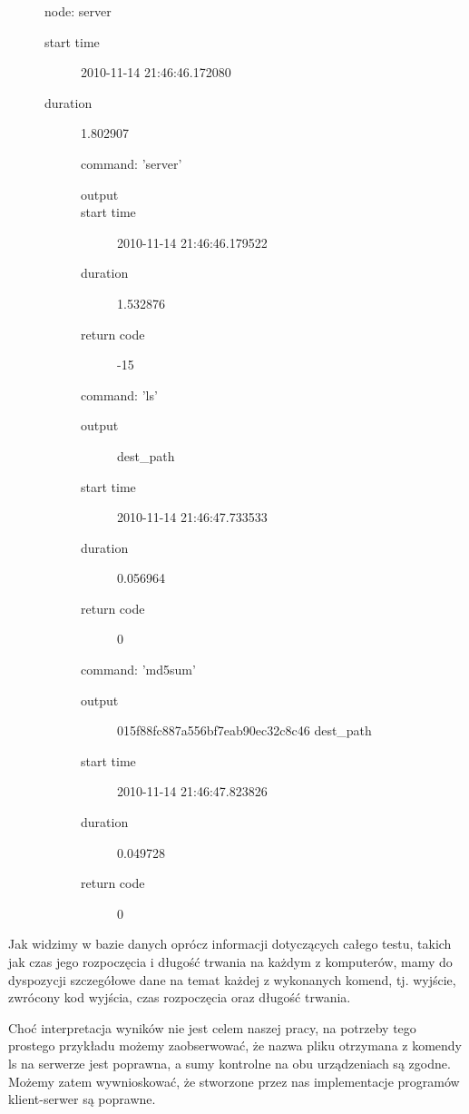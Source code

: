 \documentclass[00-praca-magisterska.tex]{subfiles}
\begin{document}
\begin{description}
\item[]
  node: server
  \begin{description}
  \item[start time] 2010-11-14 21:46:46.172080
  \item[duration] 1.802907
  \item[]
    command: 'server'
    \begin{description}
      \item[output] 
      \item[start time] 2010-11-14 21:46:46.179522
      \item[duration] 1.532876
      \item[return code] -15
    \end{description}
  \item[]
    command: 'ls'
    \begin{description}
      \item[output] dest\_path
      \item[start time] 2010-11-14 21:46:47.733533
      \item[duration] 0.056964
      \item[return code] 0
    \end{description}
  \item[]
    command: 'md5sum'
    \begin{description}
      \item[output] 015f88fc887a556bf7eab90ec32c8c46  dest\_path
      \item[start time] 2010-11-14 21:46:47.823826
      \item[duration] 0.049728
      \item[return code] 0
    \end{description}
  \end{description}
\end{description}

Jak widzimy w bazie danych oprócz informacji dotyczących całego testu, takich
jak czas jego rozpoczęcia i długość trwania na każdym z komputerów, mamy do
dyspozycji szczegółowe dane na temat każdej z wykonanych komend, tj. wyjście,
zwrócony kod wyjścia, czas rozpoczęcia oraz długość trwania.

Choć interpretacja wyników nie jest celem naszej pracy, na potrzeby tego prostego
przykładu możemy zaobserwować, że nazwa pliku otrzymana z komendy ls na serwerze
jest poprawna, a sumy kontrolne na obu urządzeniach są zgodne. Możemy zatem
wywnioskować, że stworzone przez nas implementacje programów klient-serwer są
poprawne.
\end{document}
